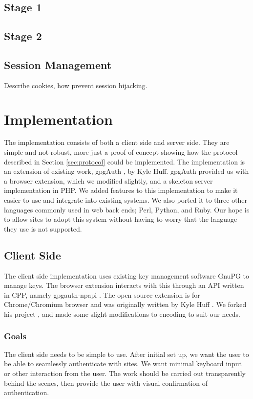 \documentclass[11pt]{article}
\begin{document}
\subsection{Stage 1} \label{subsec:stage1}

\subsection{Stage 2} \label{subsec:stage2}

\subsection{Session Management} \label{sessionManagement}
Describe cookies, how prevent session hijacking.


\section{Implementation} \label{sec:implementation}
The implementation consists of both a client side and server side. They are simple and not robust, more just a proof of concept showing how the protocol described in Section \ref{sec:protocol} could be implemented. The implementation is an extension of existing work, gpgAuth \cite{gpgauth}, by Kyle Huff. gpgAuth provided us with a browser extension, which we modified slightly, and a skeleton server implementation in PHP. We added features to this implementation to make it easier to use and integrate into existing systems. We also ported it to three other languages commonly used in web back ends; Perl, Python, and Ruby. Our hope is to allow sites to adopt this system without having to worry that the language they use is not supported. 

\subsection{Client Side}
The client side implementation uses existing key management software GnuPG to manage keys. The browser extension interacts with this through an API written in CPP, namely gpgauth-npapi \cite{npapi}. The open source extension is for Chrome/Chromium browser and was originally written by Kyle Huff \cite{ext}. We forked his project \cite{extFork}, and made some slight modifications to encoding to suit our needs.  
\subsubsection{Goals}
The client side needs to be simple to use. After initial set up, we want the user to be able to seamlessly authenticate with sites. We want minimal keyboard input or other interaction from the user. The work should be carried out transparently behind the scenes, then provide the user with visual confirmation of authentication.
\end{document}

